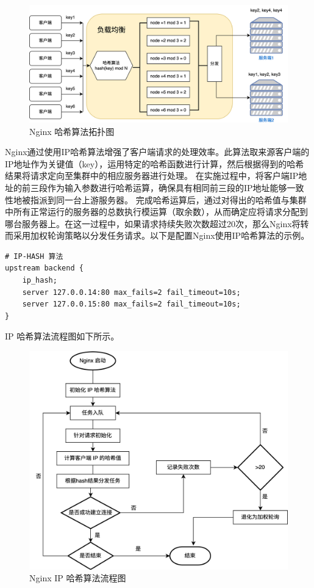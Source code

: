 \begin{figure}[htb]
	\centering
	\includegraphics[width=\textwidth]{figures/hash-algo.png}
	\caption{Nginx 哈希算法拓扑图}
\end{figure}

Nginx通过使用IP哈希算法增强了客户端请求的处理效率。此算法取来源客户端的IP地址作为关键值（key），运用特定的哈希函数进行计算，然后根据得到的哈希结果将请求定向至集群中的相应服务器进行处理。
在实施过程中，将客户端IP地址的前三段作为输入参数进行哈希运算，确保具有相同前三段的IP地址能够一致性地被指派到同一台上游服务器。
完成哈希运算后，通过对得出的哈希值与集群中所有正常运行的服务器的总数执行模运算（取余数），从而确定应将请求分配到哪台服务器上。在这一过程中，如果请求持续失败次数超过20次，那么Nginx将转而采用加权轮询策略以分发任务请求。以下是配置Nginx使用IP哈希算法的示例。

\begin{lstlisting}
# IP-HASH 算法
upstream backend {
    ip_hash;
    server 127.0.0.14:80 max_fails=2 fail_timeout=10s;
    server 127.0.0.15:80 max_fails=2 fail_timeout=10s;
}
\end{lstlisting}

IP 哈希算法流程图如下所示。

\begin{figure}[htb]
	\centering
	\includegraphics[width=\textwidth]{figures/hash-flowchart.png}
	\caption{Nginx IP 哈希算法流程图}
\end{figure}

